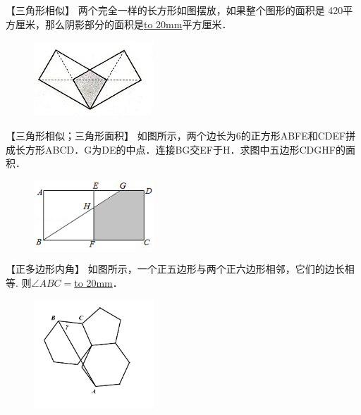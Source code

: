 \item {
    【三角形相似】
    {两个完全一样的长方形如图摆放，如果整个图形的面积是 420平方厘米，那么阴影部分的面积是\underline{\hbox to 20mm{}}平方厘米．} 
    \begin{figure}[H] 
        \centering
        \includegraphics[width=0.4\textwidth]{./pics/Chapter_3/5.png}
    \end{figure}
    \vspace{1cm}
}

\item {
    【三角形相似；三角形面积】
    {如图所示，两个边长为6的正方形ABFE和CDEF拼成长方形ABCD．G为DE的中点．连接BG交EF于H．求图中五边形CDGHF的面积．} 
    \begin{figure}[H] 
        \centering
        \includegraphics[width=0.4\textwidth]{./pics/Chapter_3/13.png}
    \end{figure}
    \vspace{1cm}
}

\item {
    【正多边形内角】
    {如图所示，一个正五边形与两个正六边形相邻，它们的边长相等. 则$\angle ABC = $\underline{\hbox to 20mm{}}．} 
    \begin{figure}[H] 
        \centering
        \includegraphics[width=0.4\textwidth]{./pics/Chapter_3/7.png}
    \end{figure}
    \vspace{1cm}
}

